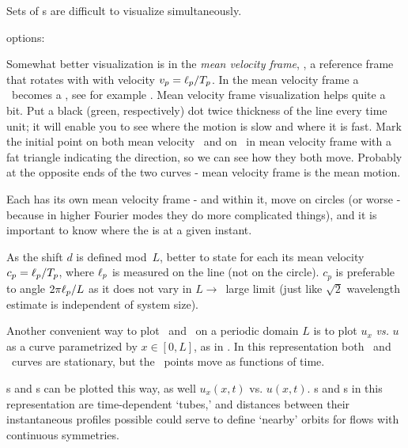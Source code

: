 Sets of \rpo s are difficult to visualize simultaneously.

options:

Somewhat better visualization is in the
{\em mean velocity frame}, {\ie},
a reference frame that rotates with with velocity
$v_p=\ell_p/{T_{p}}$.
In the mean velocity frame a \rpo\ becomes
a \po, see  for example .
Mean velocity frame visualization helps quite a bit.
Put a black (green, respectively) dot
twice thickness of the line every time unit; it will enable you to see
where the motion is slow and where it is fast.
Mark the initial point on both
mean velocity \rpo\ and on \eqv\  in mean velocity
 frame with a fat triangle
indicating the direction, so we can see how they both move. Probably at the
opposite ends of the two curves - mean velocity frame is the mean motion.


Each {\rpo} has its own mean velocity frame - and within it, {\eqv}
move on circles (or worse - because in higher Fourier modes they do more
complicated things), and it is important to know where the {\eqv} is at
a given instant.

As the shift $d$ is defined mod~$L$, better to
state for each {\rpo} its mean velocity $c_p = \ell_p/{T_{p}}$,
where $\ell_p$ is measured on the line (not on the circle). $c_p$ is
preferable to angle $2\pi \ell_p/L$ as it does not vary in $L \to$~large
limit (just like $\sqrt{2}$ wavelength estimate is independent of
system size).

Another convenient way to plot \eqva\ and \reqva\ on a periodic
domain $L$ is to plot
$u_x$ {\em vs.} $u$ as a curve parametrized by
$x\in [0,L]$,
as in .
In this representation both \eqva\ and \reqva\ curves are
stationary, but the \reqva\ points move as functions of time.

\Po s and \rpo s can be plotted this way, as well
$u_x(x,t)$ vs. $u(x,t)$. \Po s and \rpo s  in this representation
are time-dependent `tubes,' and distances between their instantaneous
profiles possible could serve to define `nearby' orbits for
flows with continuous symmetries.
